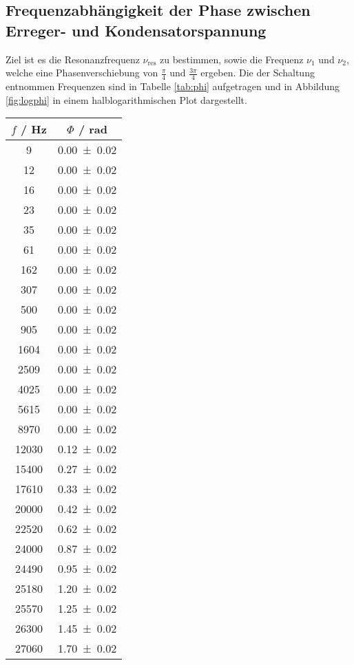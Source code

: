 \subsection{Frequenzabhängigkeit der Phase zwischen Erreger- und Kondensatorspannung}
Ziel ist es die Resonanzfrequenz $\nu_\text{res}$ zu bestimmen, sowie die Frequenz $\nu_1$ und $\nu_2$, welche eine Phasenverschiebung von $\frac{\pi}{4}$ und $\frac{3 \pi}{4}$ ergeben. Die der Schaltung entnommen Frequenzen sind in Tabelle \ref{tab:phi} aufgetragen und in Abbildung \ref{fig:logphi} in einem halblogarithmischen Plot dargestellt.
\begin{table}
  \centering
  \begin{tabular}{c c}
	\toprule
	$f$ / Hz & $\Phi$ / rad \\
	\midrule
	9   	& \num{0.00 +- 0.02} \\
	12  	& \num{0.00 +- 0.02} \\
	16  	& \num{0.00 +- 0.02} \\
	23  	& \num{0.00 +- 0.02} \\
	35  	& \num{0.00 +- 0.02} \\
	61  	& \num{0.00 +- 0.02} \\
	162 	& \num{0.00 +- 0.02} \\
	307	& \num{0.00 +- 0.02} \\
	500 	& \num{0.00 +- 0.02} \\
	905 	& \num{0.00 +- 0.02} \\
	1604 	& \num{0.00 +- 0.02} \\
	2509 	& \num{0.00 +- 0.02} \\
	4025 	& \num{0.00 +- 0.02} \\
	5615 	& \num{0.00 +- 0.02} \\
	8970 	& \num{0.00 +- 0.02} \\
	12030	& \num{0.12 +- 0.02} \\
	15400 	& \num{0.27 +- 0.02} \\
	17610 	& \num{0.33 +- 0.02} \\
	20000 	& \num{0.42 +- 0.02} \\
	22520 	& \num{0.62 +- 0.02} \\
	24000 	& \num{0.87 +- 0.02} \\
	24490 	& \num{0.95 +- 0.02} \\
	25180 	& \num{1.20 +- 0.02} \\
	25570 	& \num{1.25 +- 0.02} \\
	26300 	& \num{1.45 +- 0.02} \\
	27060 	& \num{1.70 +- 0.02} \\

\end{tabular}
\end{table}
